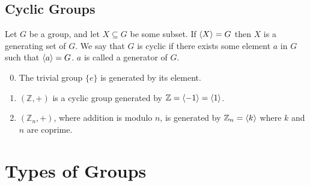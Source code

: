 \documentclass{article}
\begin{document}
\subsection{Cyclic Groups}
\begin{definition}
	Let $G$ be a group, and let $X \subseteq G$ be some subset. If $\langle X \rangle = G$ then $X$ is a generating set of $G$. We say that $G$ is cyclic if there exists some element $a$ in $G$ such that $\langle a \rangle = G$. $a$ is called a generator of $G$.
\end{definition}
\begin{enumerate}
	\setcounter{enumi}{-1}
	\item The trivial group $\{ e \}$ is generated by its element.
	\item $(\mathbb Z, +)$ is a cyclic group generated by $\mathbb Z = \langle -1 \rangle = \langle 1 \rangle$.
	\item $(\mathbb Z_n, +)$, where addition is modulo $n$, is generated by $\mathbb Z_n = \langle k \rangle$ where $k$ and $n$ are coprime.
\end{enumerate}

\section{Types of Groups}
\end{document}
